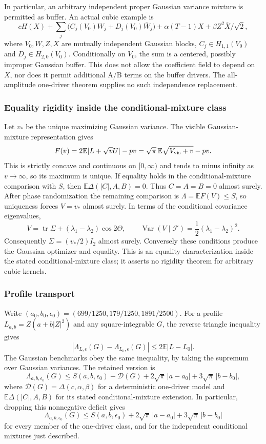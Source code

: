 In particular, an arbitrary independent proper Gaussian variance mixture
is permitted as buffer. An actual cubic example is
\[
 cH(X)+\sum_j\bigl(C_j(V_0)W_j+D_j(V_0)\overline W_j\bigr)
       +\alpha(T-1)X+\beta Z^2\overline X/\sqrt2,
\]
where $V_0,W,Z,X$ are mutually independent Gaussian blocks,
$C_j\in H_{1,1}(V_0)$ and $D_j\in H_{2,0}(V_0)$.
Conditionally on $V_0$, the sum is a centered, possibly improper
Gaussian buffer. This does not allow the coefficient field to depend
on $X$, nor does it permit additional A/B terms on the buffer drivers.
The all-amplitude one-driver theorem supplies no such independence
replacement.

\subsubsection{Equality rigidity inside the conditional-mixture class}
Let $v_*$ be the unique maximizing Gaussian variance. The visible
Gaussian-mixture representation gives
\[
F(v)=2\mathbb E|L+\sqrt vU|-pv
=\sqrt\pi\,\mathbb E\sqrt{V_{\rm vis}+v}-pv.
\]
This is strictly concave and continuous on $[0,\infty)$ and tends
to minus infinity as $v\to\infty$, so its maximum is unique.
If equality holds in the conditional-mixture comparison with $S$,
then $\mathbb E\Delta(|C|,A,B)=0$. Thus $C=A=B=0$ almost surely.
After phase randomization the remaining comparison is
$\Lambda=\mathbb EF(V)\le S$, so uniqueness forces $V=v_*$
almost surely. In terms of the conditional covariance eigenvalues,
\[
V=\operatorname{tr}\Sigma+(\lambda_1-\lambda_2)\cos2\Theta,
\qquad
\operatorname{Var}(V\mid\mathcal F)
=\frac12(\lambda_1-\lambda_2)^2.
\]
Consequently $\Sigma=(v_*/2)I_2$ almost surely. Conversely these
conditions produce the Gaussian optimizer and equality. This is an
equality characterization inside the stated conditional-mixture class;
it asserts no rigidity theorem for arbitrary cubic kernels.

\subsubsection{Profile transport}
Write $(a_0,b_0,\epsilon_0)=(699/1250,179/1250,1891/2500)$.
For a profile $L_{a,b}=Z(a+b|Z|^2)$ and any square-integrable $G$,
the reverse triangle inequality gives
\[
 |\Lambda_{L,\epsilon}(G)-\Lambda_{L_0,\epsilon}(G)|
 \le2\mathbb E|L-L_0|.
\]
The Gaussian benchmarks obey the same inequality, by taking the
supremum over Gaussian variances. The retained version is
\[
 \Lambda_{a,b,\epsilon_0}(G)\le S(a,b,\epsilon_0)
 -\mathcal D(G)+2\sqrt\pi\,|a-a_0|+3\sqrt\pi\,|b-b_0|,
\]
where $\mathcal D(G)=\Delta(c,\alpha,\beta)$ for a deterministic
one-driver model and $\mathbb E\Delta(|C|,A,B)$ for its stated
conditional-mixture extension. In particular, dropping this
nonnegative deficit gives
\[
 \Lambda_{a,b,\epsilon_0}(G)\le S(a,b,\epsilon_0)
        +2\sqrt\pi\,|a-a_0|+3\sqrt\pi\,|b-b_0|
\]
for every member of the one-driver class, and for the independent
conditional mixtures just described.

